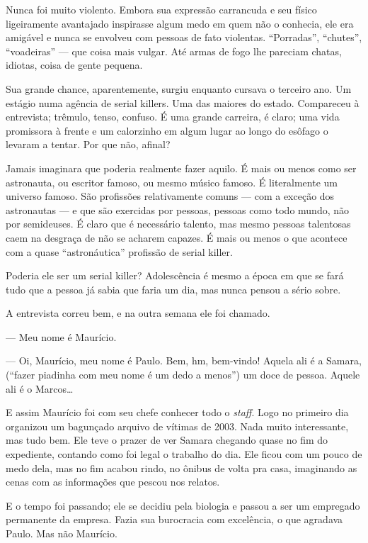 Nunca foi muito violento. Embora sua expressão carrancuda e seu físico ligeiramente avantajado inspirasse algum me\-do em quem não o conhecia, ele era amigável e nunca se envolveu com pessoas de fato violentas. ``Porradas'', ``chutes'', ``voadeiras'' --- que coisa mais vulgar. Até armas de fogo lhe pareciam chatas, idiotas, coisa de gente pequena.

Sua grande chance, aparentemente, surgiu enquanto cursava o terceiro ano. Um estágio numa agência de \foreignlanguage{english}{serial killers}. Uma das maiores do estado. Compareceu à entrevista; trêmulo, tenso, confuso. É uma grande carreira, é claro; uma vida promissora à frente e um calorzinho em algum lugar ao longo do esôfago o levaram a tentar. Por que não, afinal?

Jamais imaginara que poderia realmente fazer aquilo. É mais ou menos como ser astronauta, ou escritor famoso, ou mesmo músico famoso. É literalmente um universo famoso. São profissões relativamente comuns --- com a exceção dos astronautas --- e que são exercidas por pessoas, pessoas como todo mundo, não por semideuses. É claro que é necessário talento, mas mesmo pessoas talentosas caem na desgraça de não se acharem capazes. É mais ou menos o que acontece com a quase ``astronáutica'' profissão de \foreignlanguage{english}{serial killer}.

Poderia ele ser um \foreignlanguage{english}{serial killer}? Adolescência é mesmo a época em que se fará tudo que a pessoa já sabia que faria um dia, mas nunca pensou a sério sobre.

A entrevista correu bem, e na outra semana ele foi cha\-ma\-do.

--- Meu nome é Maurício.

--- Oi, Maurício, meu nome é Paulo. Bem, hm, bem-vindo! Aquela ali é a Samara, (``fazer piadinha com meu nome é um dedo a menos'') um doce de pessoa. Aquele ali é o Marcos\ldots

E assim Maurício foi com seu chefe conhecer todo o \foreignlanguage{english}{\emph{staff}}. Logo no primeiro dia organizou um bagunçado arquivo de vítimas de 2003. Nada muito interessante, mas tudo bem. Ele teve o prazer de ver Samara chegando quase no fim do expediente, contando como foi legal o trabalho do dia. Ele ficou com um pouco de medo dela, mas no fim acabou rindo, no ônibus de volta pra casa, imaginando as cenas com as informações que pescou nos relatos.

E o tempo foi passando; ele se decidiu pela biologia e passou a ser um empregado permanente da empresa. Fazia sua burocracia com excelência, o que agradava Paulo. Mas não Maurício.

